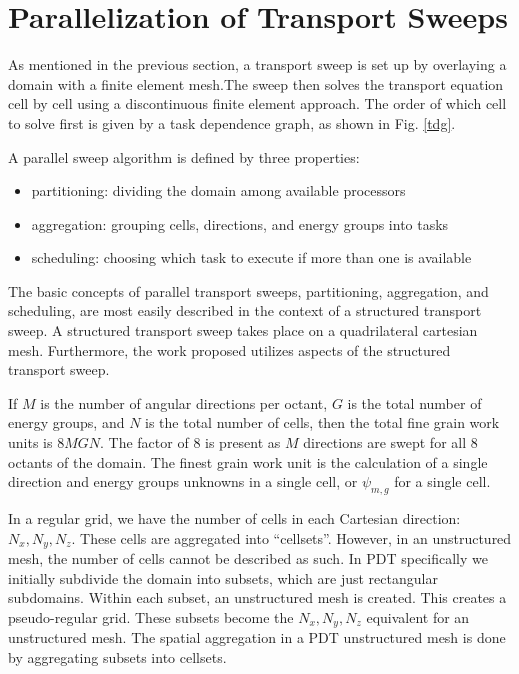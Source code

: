 \documentclass[11pt, letterpaper,titlepage,oneside]{article}
\begin{document}
\section{Parallelization of Transport Sweeps}

As mentioned in the previous section, a transport sweep is set up by overlaying a domain with a finite element mesh.The sweep then solves the transport equation cell by cell using a discontinuous finite element approach. The order of which cell to solve first is given by a task dependence graph, as shown in Fig. \ref{tdg}.

A parallel sweep algorithm is defined by three properties:
\begin{itemize}
\item partitioning: dividing the domain among available processors
\item aggregation: grouping cells, directions, and energy groups into tasks
\item scheduling: choosing which task to execute if more than one is available
\end{itemize}

The basic concepts of parallel transport sweeps, partitioning, aggregation, and scheduling, are most easily described in the context of a structured transport sweep. A structured transport sweep takes place on a quadrilateral cartesian mesh. Furthermore, the work proposed utilizes aspects of the structured transport sweep.

If $M$ is the number of angular directions per octant, $G$ is the total number of energy groups, and $N$ is the total number of cells, then the total fine grain work units is $8MGN$. The factor of 8 is present as $M$ directions are swept for all 8 octants of the domain. The finest grain work unit is the calculation of a single direction and energy groups unknowns in a single cell, or $\psi_{m,g}$ for a single cell.

In a regular grid, we have the  number of cells in each Cartesian direction: $N_x, N_y, N_z$. These cells are aggregated into ``cellsets''. However, in an unstructured mesh, the number of cells cannot be described as such. In PDT specifically we initially subdivide the domain into subsets, which are just rectangular subdomains. Within each subset, an unstructured mesh is created. This creates a pseudo-regular grid. These subsets become the $N_x, N_y, N_z$ equivalent for an unstructured mesh. The spatial aggregation in a PDT unstructured mesh is done by aggregating subsets into cellsets. 
\end{document}

